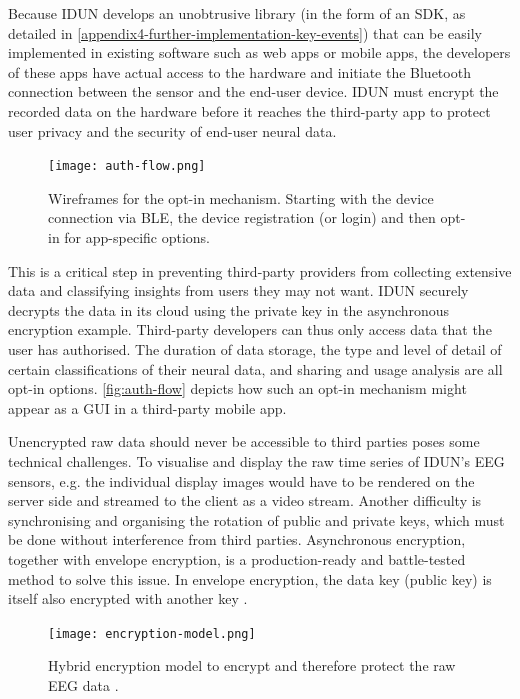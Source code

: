 Because IDUN develops an unobtrusive library (in the form of an SDK, as detailed in \autoref{appendix4-further-implementation-key-events}) that can be easily implemented in existing software such as web apps or mobile apps, the developers of these apps have actual access to the hardware and initiate the Bluetooth connection between the sensor and the end-user device. IDUN must encrypt the recorded data on the hardware before it reaches the third-party app to protect user privacy and the security of end-user neural data.

\begin{figure}[!ht]
  \centering
  \texttt{[image: auth-flow.png]}
  \caption{Wireframes for the opt-in mechanism. Starting with the device connection via BLE, the device registration (or login) and then opt-in for app-specific options.}
  \label{fig:auth-flow}
\end{figure}

This is a critical step in preventing third-party providers from collecting extensive data and classifying insights from users they may not want. IDUN securely decrypts the data in its cloud using the private key in the asynchronous encryption example. Third-party developers can thus only access data that the user has authorised. The duration of data storage, the type and level of detail of certain classifications of their neural data, and sharing and usage analysis are all opt-in options. \autoref{fig:auth-flow} depicts how such an opt-in mechanism might appear as a GUI in a third-party mobile app.

Unencrypted raw data should never be accessible to third parties poses some technical challenges. To visualise and display the raw time series of IDUN's EEG sensors, e.g. the individual display images would have to be rendered on the server side and streamed to the client as a video stream. Another difficulty is synchronising and organising the rotation of public and private keys, which must be done without interference from third parties. Asynchronous encryption, together with envelope encryption, is a production-ready and battle-tested method to solve this issue. In envelope encryption, the data key (public key) is itself also encrypted with another key \citep{google_cloud_envelope_nodate}.

\begin{figure}[!ht]
  \centering
  \texttt{[image: encryption-model.png]}
  \caption[Hybrid encryption model to encrypt and therefore protect the raw EEG data]{Hybrid encryption model to encrypt and therefore protect the raw EEG data \citep{idun_guardian_nodate}.}
  \label{fig:encryption-model}
\end{figure}

